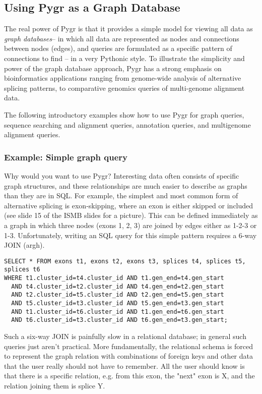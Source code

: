 \documentclass{howto}
\begin{document}
\subsection{Using Pygr as a Graph Database}
The real power of Pygr is that it provides a simple model for viewing
all data as {\em graph databases}-- in which all data are represented
as nodes and connections between nodes (edges), and queries are formulated
as a specific pattern of connections to find --
in a very Pythonic style.  To illustrate the simplicity and power
of the graph database approach, Pygr has a strong emphasis
on bioinformatics applications ranging from genome-wide analysis of
alternative splicing patterns, to comparative genomics queries of
multi-genome alignment data.

The following introductory examples show how to use Pygr for graph queries, sequence searching and alignment queries, annotation queries, and multigenome alignment queries.


\subsubsection{Example: Simple graph query}
Why would you want to use Pygr?  Interesting data often consists of specific graph structures, and these relationships are much easier to describe as graphs than they are in SQL.  For example, the simplest and most common form of alternative splicing is exon-skipping, where an exon is either skipped or included (see slide 15 of the ISMB slides for a picture).  This can be defined immediately as a graph in which three nodes (exons 1, 2, 3) are joined by edges either as 1-2-3 or 1-3.  Unfortunately, writing an SQL query for this simple pattern requires a 6-way JOIN (argh).

\begin{verbatim}
SELECT * FROM exons t1, exons t2, exons t3, splices t4, splices t5, splices t6 
WHERE t1.cluster_id=t4.cluster_id AND t1.gen_end=t4.gen_start 
  AND t4.cluster_id=t2.cluster_id AND t4.gen_end=t2.gen_start 
  AND t2.cluster_id=t5.cluster_id AND t2.gen_end=t5.gen_start 
  AND t5.cluster_id=t3.cluster_id AND t5.gen_end=t3.gen_start 
  AND t1.cluster_id=t6.cluster_id AND t1.gen_end=t6.gen_start 
  AND t6.cluster_id=t3.cluster_id AND t6.gen_end=t3.gen_start;
\end{verbatim}

Such a six-way JOIN is painfully slow in a relational database; in general such queries just aren't practical.  More fundamentally, the relational schema is forced to represent the graph relation with combinations of foreign keys and other data that the user really should not have to remember.  All the user should know is that there is a specific relation, e.g. from this exon, the "next" exon is X, and the relation joining them is splice Y.
\end{document}
